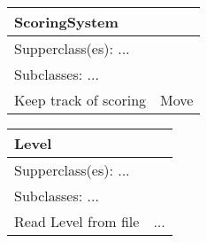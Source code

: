 \begin{figure}[H]
\begin{subfigure}{}
\begin{tabular}{|p{1in}|p{1in}|}
		\end{tabular}
\end{subfigure}
\begin{subfigure}{}		
		\begin{tabular}{|p{1in}|p{1in}|}
			\hline
			\multicolumn{2}{|p{2in}|}{\textbf{ScoringSystem}} \\ \hline
			\multicolumn{2}{|p{2in}|}{Supperclass(es): ...} \\ \hline
			\multicolumn{2}{|p{2in}|}{Subclasses: ...} \\ \hline
			Keep track of scoring & Move \\ \hline
		\end{tabular}
		\begin{tabular}{|p{1in}|p{1in}|}
			\hline
			\multicolumn{2}{|p{2in}|}{\textbf{Level}} \\ \hline
			\multicolumn{2}{|p{2in}|}{Supperclass(es): ...} \\ \hline
			\multicolumn{2}{|p{2in}|}{Subclasses: ...} \\ \hline
			Read Level from file & ... \\ \hline
		\end{tabular}
\end{subfigure}

\end{figure}
%
